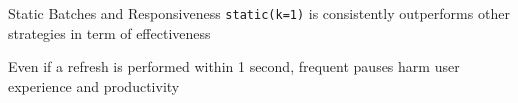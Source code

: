 \documentclass[14pt]{beamer}
\begin{document}










\begin{frame}{Static Batches and Responsiveness}
    \texttt{static(k=1)} is consistently outperforms other strategies in term of
    effectiveness

    \vskip 0.5cm
    Even if a refresh is performed within 1 second, frequent pauses harm user
    experience and productivity
\end{frame}
\end{document}

